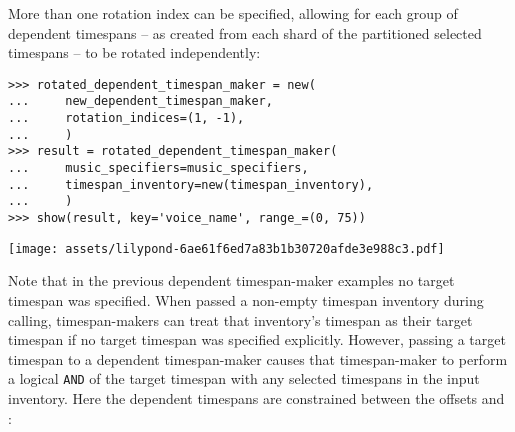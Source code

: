 \noindent More than one rotation index can be specified, allowing for each
group of dependent timespans -- as created from each shard of the partitioned
selected timespans -- to be rotated independently:

\begin{comment}
<abjad>
rotated_dependent_timespan_maker = new(
    new_dependent_timespan_maker,
    rotation_indices=(1, -1),
    )
result = rotated_dependent_timespan_maker(
    music_specifiers=music_specifiers,
    timespan_inventory=new(timespan_inventory),
    )
show(result, key='voice_name', range_=(0, 75))
</abjad>
\end{comment}

\begin{abjadbookoutput}
\begin{singlespacing}
\vspace{-0.5\baselineskip}
\begin{verbatim}
>>> rotated_dependent_timespan_maker = new(
...     new_dependent_timespan_maker,
...     rotation_indices=(1, -1),
...     )
>>> result = rotated_dependent_timespan_maker(
...     music_specifiers=music_specifiers,
...     timespan_inventory=new(timespan_inventory),
...     )
>>> show(result, key='voice_name', range_=(0, 75))
\end{verbatim}
\noindent\texttt{[image: assets/lilypond-6ae61f6ed7a83b1b30720afde3e988c3.pdf]}
\end{singlespacing}
\end{abjadbookoutput}

\noindent Note that in the previous dependent timespan-maker examples no target
timespan was specified. When passed a non-empty timespan inventory during
calling, timespan-makers can treat that inventory's timespan as their target
timespan if no target timespan was specified explicitly. However, passing a
target timespan to a dependent timespan-maker causes that timespan-maker to
perform a logical \texttt{AND} of the target timespan with any selected
timespans in the input inventory. Here the dependent timespans are constrained
between the offsets  and :

\begin{comment}
<abjad>
result = new_dependent_timespan_maker(
    music_specifiers=music_specifiers,
    target_timespan=timespantools.Timespan(17, 58),
    timespan_inventory=new(timespan_inventory),
    )
show(result, key='voice_name', range_=(0, 75))
</abjad>
\end{comment}

